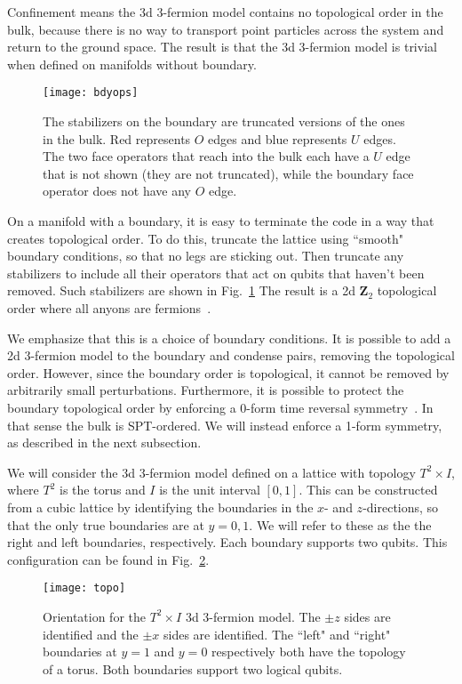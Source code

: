 Confinement means the 3d 3-fermion model contains no topological order in the bulk, because there is no way to transport point particles across the system and return to the ground space. The result is that the 3d 3-fermion model is trivial when defined on manifolds without boundary.

\begin{figure}
\centering
\texttt{[image: bdyops]}
\caption[Stabilizers on the boundary of the Walker-Wang model]{The stabilizers on the boundary are truncated versions of the ones in the bulk. Red represents $O$ edges and blue represents $U$ edges. The two face operators that reach into the bulk each have a $U$ edge that is not shown (they are not truncated), while the boundary face operator does not have any $O$ edge.}
\label{fig:bdyops}
\end{figure}

On a manifold with a boundary, it is easy to terminate the code in a way that creates topological order. To do this, truncate the lattice using ``smooth" boundary conditions, so that no legs are sticking out. Then truncate any stabilizers to include all their operators that act on qubits that haven't been removed. Such stabilizers are shown in Fig.~\ref{fig:bdyops} The result is a 2d $\mathbf{Z}_2$ topological order where all anyons are fermions~\cite{Burnell2014Soluble}.

We emphasize that this is a choice of boundary conditions. It is possible to add a 2d 3-fermion model to the boundary and condense pairs, removing the topological order. However, since the boundary order is topological, it cannot be removed by arbitrarily small perturbations. Furthermore, it is possible to protect the boundary topological order by enforcing a 0-form time reversal symmetry~\cite{Burnell2014Soluble}. In that sense the bulk is SPT-ordered. We will instead enforce a 1-form symmetry, as described in the next subsection.
	
We will consider the 3d 3-fermion model defined on a lattice with topology $T^2\times I$, where $T^2$ is the torus and $I$ is the unit interval $[0,1]$. This can be constructed from a cubic lattice by identifying the boundaries in the $x$- and $z$-directions, so that the only true boundaries are at $y=0,1$. We will refer to these as the the right and left boundaries, respectively. Each boundary supports two qubits. This configuration can be found in Fig.~\ref{fig:topo}.

\begin{figure}
\centering
\texttt{[image: topo]}
\caption[Orientation for the $T^2\times I$ 3d 3-fermion model]{Orientation for the $T^2\times I$ 3d 3-fermion model. The $\pm z$ sides are identified and the $\pm x$ sides are identified. The ``left" and ``right" boundaries at $y=1$ and $y=0$ respectively both have the topology of a torus. Both boundaries support two logical qubits.}
\label{fig:topo}
\end{figure}

